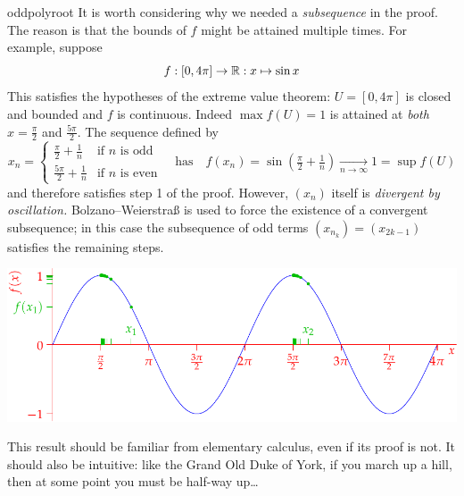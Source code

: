 
\begin{example}{}{oddpolyroot}
	It is worth considering why we needed a \emph{subsequence} in the proof. The reason is that the bounds of $f$ might be attained multiple times. For example, suppose
	\[
		f:[0,4\pi]\to\mathbb{R}:x\mapsto \sin x
	\]
	This satisfies the hypotheses of the extreme value theorem: $U=[0,4\pi]$ is closed and bounded and $f$ is continuous. Indeed $\max f(U)=1$ is attained at \emph{both} $x=\frac\pi 2$ and $\frac{5\pi}2$. The sequence defined by
	\[
		x_n=
		\begin{cases}
			\frac\pi 2+\frac 1n&\text{if $n$ is odd}\\
			\frac{5\pi}2+\frac 1n&\text{if $n$ is even}
		\end{cases}
		\quad\text{has}\quad 
		f(x_n)=\sin\left(\tfrac\pi 2+\tfrac 1n\right)
		\xrightarrow[n\to\infty]{} 1=\sup f(U)
	\]
	and therefore satisfies step 1 of the proof. However, $(x_n)$ itself is \emph{divergent by oscillation.} Bolzano--Weierstraß is used to force the existence of a convergent subsequence; in this case the subsequence of odd terms $(x_{n_k})=(x_{2k-1})$ satisfies the remaining steps.
	\begin{center}
		\includegraphics[scale=0.95]{extval}
	\end{center}
\end{example}


\goodbreak



This result should be familiar from elementary calculus, even if its proof is not. It should also be intuitive: like the Grand Old Duke of York, if you march up a hill, then at some point you must be half-way up\ldots


